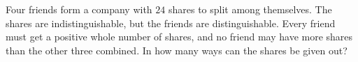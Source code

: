 Four friends form a company with $24$ shares to split among themselves. The shares are indistinguishable, but the friends are distinguishable. Every friend must get a positive whole number of shares, and no friend may have more shares than the other three combined. In how many ways can the shares be given out?
